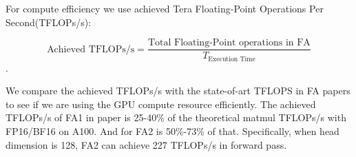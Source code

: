 \documentclass[11pt]{article}
\renewcommand\cite{\citep}  %
\begin{document}
For compute efficiency we use achieved Tera Floating-Point Operations Per Second(TFLOPs/s): 

$$\text{Achieved TFLOPs/s} = \frac{\text{Total Floating-Point operations in FA}}{T_{\text{Execution Time}}}$$.

We compare the achieved TFLOPs/s with the state-of-art TFLOPS in FA papers to see if we are using the GPU compute resource efficiently. The achieved TFLOPs/s of FA1 in paper is 25-40\% of the theoretical matmul TFLOPs/s with FP16/BF16 on A100. And for FA2 is 50\%-73\% of that\cite{dao2023flashattention}. Specifically, when head dimension is 128, FA2 can achieve 227 TFLOPs/s in forward pass.




 \begin{comment}
\begin{algorithm}[htbp]
  \caption{Standard Attention}
  \label{alg:standard_attention}
  \begin{algorithmic}[1]
    \STATE Load $Q$ and $K$ by blocks from HBM.
    \STATE Compute $S = (1/\sqrt{d})QK^T$ (GEMM-I).
    \STATE Write $S$ to HBM.
    \STATE Read $S$ from HBM.
    \STATE Compute $S = S - \text{rowmax}(S)$.
    \STATE Compute $P = \text{softmax}(S)$.
    \STATE Write $P$ to HBM.
    \STATE Load $P$ and $V$ by blocks from HBM.
    \STATE Compute $O = PV$ (GEMM-II).
    \STATE Write $O$ to HBM.
  \end{algorithmic}
\end{algorithm}
\end{comment}

\end{document}
